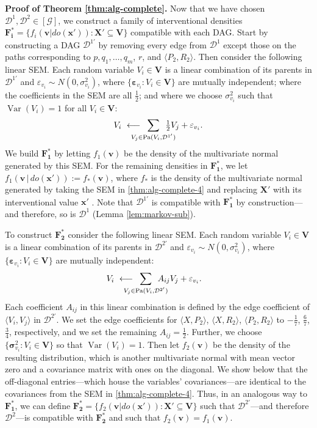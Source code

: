 \documentclass[11pt]{article}
\DeclareMathOperator{\Var}{Var}
\DeclareMathOperator{\Pa}{Pa}
\newcommand{\mb}[1]{\mathbf{#1}}
\newcommand{\g}[1][G]{\mathcal{#1}}
\newenvironment{proofofnoqed}[1][]{\noindent \textbf{Proof of #1.}}{}
\begin{document}
\begin{proofofnoqed}[Theorem \ref{thm:alg-complete}]
    Now that we have chosen $\g[D]^1, \g[D]^2 \in [\g]$, we construct a family of interventional densities $\mb{F^*_i} = \{ f_i(\mb{v}|do(\mb{x'})) : \mb{X'} \subseteq \mb{V} \}$ compatible with each DAG. Start by constructing a DAG $\g[D]^{1'}$ by removing every edge from $\g[D]^1$ except those on the paths corresponding to $p, q_1, \dots, q_m$, $r$, and $\langle P_2, R_2 \rangle$. Then consider the following linear SEM. Each random variable $V_i \in \mb{V}$ is a linear combination of its parents in $\g[D]^{1'}$ and $\varepsilon_{v_i} \sim N(0, \sigma^2_{v_i})$, where $\{\mb{\varepsilon}_{v_i}: V_i \in \mb{V}\}$ are mutually independent; where the coefficients in the SEM are all $\tfrac{1}{2}$; and where we choose $\sigma^2_{v_i}$ such that $\Var(V_i)=1$ for all $V_i \in \mb{V}$:
    \begin{align}
    \label{thm:alg-complete-4}
        V_i \ \longleftarrow \mspace{-25mu} \sum_{V_j \in \Pa(V_i, \g[D]^{1'})} \mspace{-25mu} \tfrac{1}{2} V_j + \varepsilon_{v_i}.
    \end{align}
    We build $\mb{F^*_1}$ by letting $f_1(\mb{v})$ be the density of the multivariate normal generated by this SEM. For the remaining densities in $\mb{F^*_1}$, we let $f_1(\mb{v} \,|\, do(\mb{x'})) := f_*(\mb{v})$, where $f_*$ is  the density of the multivariate normal generated by taking the SEM in \eqref{thm:alg-complete-4} and replacing $\mb{X'}$ with its interventional value $\mb{x'}$ \citep{pearl2009causality}. Note that $\g[D]^{1'}$ is compatible with $\mb{F^*_1}$ by construction---and therefore, so is $\g[D]^1$ (Lemma \ref{lem:markov-sub}).

    To construct $\mb{F^*_2}$ consider the following linear SEM. Each random variable $V_i \in \mb{V}$ is a linear combination of its parents in $\g[D]^{2'}$ and $\varepsilon_{v_i} \sim N(0, \sigma^2_{v_i})$, where $\{\mb{\varepsilon}_{v_i}: V_i \in \mb{V}\}$ are mutually independent:
    \begin{align}
    \label{thm:alg-complete-5}
        V_i \ &\longleftarrow \mspace{-25mu} \sum_{V_j \in \Pa(V_i, \g[D]^{2'})} \mspace{-25mu} A_{ij} V_j + \varepsilon_{v_i}.
    \end{align}
    Each coefficient $A_{ij}$ in this linear combination is defined by the edge coefficient of $\langle V_i, V_j \rangle$ in $\g[D]^{2'}$. We set the edge coefficients for $\langle X,P_2 \rangle$, $\langle X,R_2 \rangle$, $\langle P_2,R_2 \rangle$ to $-\tfrac{1}{7}$, $\tfrac{6}{7}$, $\tfrac{3}{4}$, respectively, and we set the remaining $A_{ij} = \tfrac{1}{2}$. Further, we choose $\{\mb{\sigma}^2_{v_i}: V_i \in \mb{V}\}$ so that $\Var(V_i)=1$. Then let $f_2(\mb{v})$ be the density of the resulting distribution, which is another multivariate normal with mean vector zero and a covariance matrix with ones on the diagonal. We show below that the off-diagonal entries---which house the variables' covariances---are identical to the covariances from the SEM in \eqref{thm:alg-complete-4}. Thus, in an analogous way to $\mb{F^*_1}$, we can define $\mb{F^*_2} = \{ f_2(\mb{v}|do(\mb{x'})) : \mb{X'} \subseteq \mb{V} \}$ such that $\g[D]^{2'}$---and therefore $\g[D]^2$---is compatible with $\mb{F^*_2}$ and such that $f_2(\mb{v}) = f_1(\mb{v})$.
    

\end{proofofnoqed}
\end{document}
